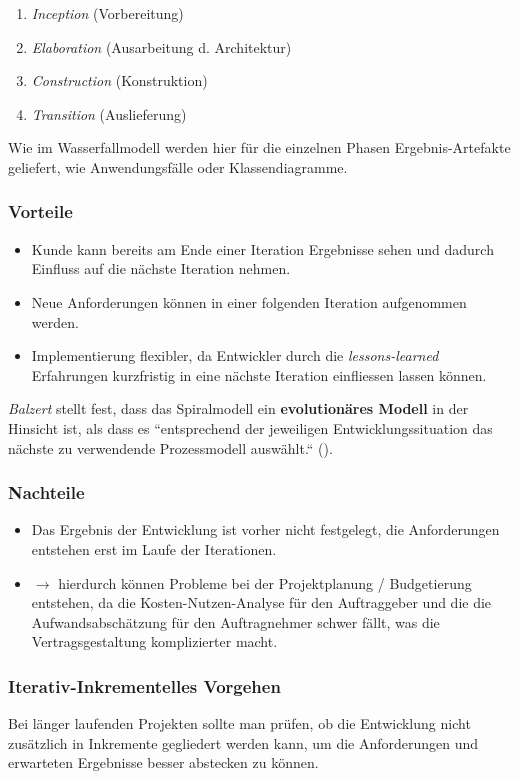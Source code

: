 \begin{enumerate}
    \item \textit{Inception} (Vorbereitung)
    \item \textit{Elaboration} (Ausarbeitung d. Architektur)
    \item \textit{Construction} (Konstruktion)
    \item \textit{Transition} (Auslieferung)
\end{enumerate}

\noindent
Wie im Wasserfallmodell werden hier für die einzelnen Phasen Ergebnis-Artefakte geliefert, wie Anwendungsfälle oder Klassendiagramme.


\subsubsection*{Vorteile}

\begin{itemize}
    \item Kunde kann bereits am Ende einer Iteration Ergebnisse sehen und dadurch Einfluss auf die nächste Iteration nehmen.
    \item Neue Anforderungen können in einer folgenden Iteration aufgenommen werden.
    \item Implementierung flexibler, da Entwickler durch die \textit{lessons-learned} Erfahrungen kurzfristig in eine nächste Iteration einfliessen lassen können.
\end{itemize}

\noindent
\textit{Balzert} stellt fest, dass das Spiralmodell ein \textbf{evolutionäres Modell} in der Hinsicht ist, als dass es ``entsprechend der jeweiligen Entwicklungssituation das nächste zu verwendende Prozessmodell auswählt.`` (\cite[556]{Bal08}).

\subsubsection*{Nachteile}

\begin{itemize}
    \item Das Ergebnis der Entwicklung ist vorher nicht festgelegt, die Anforderungen entstehen erst im Laufe der Iterationen.
    \item[] $\rightarrow$ hierdurch können Probleme bei der Projektplanung / Budgetierung entstehen, da die Kosten-Nutzen-Analyse für den Auftraggeber und die die Aufwandsabschätzung für den Auftragnehmer schwer fällt, was die Vertragsgestaltung komplizierter macht.
\end{itemize}

\subsubsection*{Iterativ-Inkrementelles Vorgehen}
Bei länger laufenden Projekten sollte man prüfen, ob die Entwicklung nicht zusätzlich in Inkremente gegliedert werden kann, um die Anforderungen und erwarteten Ergebnisse besser abstecken zu können.

